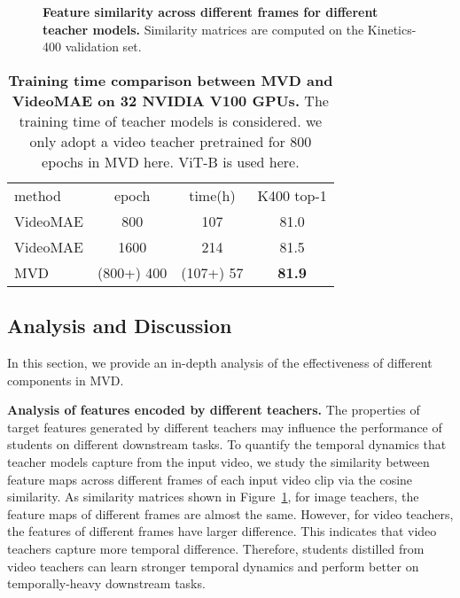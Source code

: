 \documentclass[10pt,twocolumn,letterpaper]{article}
\makeatletter
\newcommand*{\system}{MVD\@\xspace}
\makeatother
\begin{document}
\begin{figure}\centering
    \qquad
    \caption{\textbf{Feature similarity across different frames for different teacher models.} Similarity matrices are computed on the Kinetics-400 validation set.}\label{fig:teacher_frame_similarity}\vspace{-5pt}
\end{figure}

\begin{table}[t]
\centering
\begin{tabular}{lcc|c}
method & epoch & time(h) & K400 top-1 \\
\shline
VideoMAE & 800 & 107 & 81.0 \\
VideoMAE & 1600 & 214 & 81.5    \\
MVD & (800+) 400 & (107+) 57  & \textbf{81.9} \\
\end{tabular}
\caption{\textbf{Training time comparison between MVD and VideoMAE on 32 NVIDIA V100 GPUs.} The training time of teacher models is considered. we only adopt a video teacher pretrained for 800 epochs in MVD here. ViT-B is used here.}
\label{tab:compare_considering_time}
\vspace{-10pt}
\end{table}




\subsection{Analysis and Discussion}
In this section, we provide an in-depth analysis of the effectiveness of different components in \system. 

\label{sec:ablation}
\noindent \textbf{Analysis of features encoded by different teachers.} The properties of target features generated by different teachers may influence the performance of students on different downstream tasks. To quantify the temporal dynamics that teacher models capture from the input video, we study the similarity between feature maps across different frames of each input video clip via the cosine similarity. As similarity matrices shown in Figure~\ref{fig:teacher_frame_similarity},  for image teachers, the feature maps of different frames are almost the same. However, for video teachers, the features of different frames have larger difference. This indicates that video teachers capture more temporal difference. Therefore, students distilled from video teachers can learn stronger temporal dynamics and perform better on temporally-heavy downstream tasks.
\end{document}
